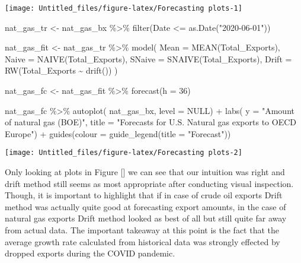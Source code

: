 \documentclass[
]{article}
\newenvironment{Shaded}{\begin{snugshade}}{\end{snugshade}}
\newcommand{\AttributeTok}[1]{\textcolor[rgb]{0.77,0.63,0.00}{#1}}
\newcommand{\ConstantTok}[1]{\textcolor[rgb]{0.00,0.00,0.00}{#1}}
\newcommand{\DecValTok}[1]{\textcolor[rgb]{0.00,0.00,0.81}{#1}}
\newcommand{\FunctionTok}[1]{\textcolor[rgb]{0.00,0.00,0.00}{#1}}
\newcommand{\NormalTok}[1]{#1}
\newcommand{\OtherTok}[1]{\textcolor[rgb]{0.56,0.35,0.01}{#1}}
\newcommand{\SpecialCharTok}[1]{\textcolor[rgb]{0.00,0.00,0.00}{#1}}
\newcommand{\StringTok}[1]{\textcolor[rgb]{0.31,0.60,0.02}{#1}}
\begin{document}
\begin{center}\texttt{[image: Untitled\_files/figure-latex/Forecasting plots-1]} \end{center}

\begin{Shaded}
\begin{Highlighting}[]
\NormalTok{nat\_gas\_tr }\OtherTok{\textless{}{-}}\NormalTok{ nat\_gas\_bx }\SpecialCharTok{\%\textgreater{}\%} 
  \FunctionTok{filter}\NormalTok{(Date }\SpecialCharTok{\textless{}=} \FunctionTok{as.Date}\NormalTok{(}\StringTok{"2020{-}06{-}01"}\NormalTok{))}


\NormalTok{nat\_gas\_fit }\OtherTok{\textless{}{-}}\NormalTok{ nat\_gas\_tr }\SpecialCharTok{\%\textgreater{}\%} 
  \FunctionTok{model}\NormalTok{(}
    \AttributeTok{Mean =} \FunctionTok{MEAN}\NormalTok{(Total\_Exports),}
    \AttributeTok{Naive =} \FunctionTok{NAIVE}\NormalTok{(Total\_Exports),}
    \AttributeTok{SNaive =} \FunctionTok{SNAIVE}\NormalTok{(Total\_Exports),}
    \AttributeTok{Drift =} \FunctionTok{RW}\NormalTok{(Total\_Exports }\SpecialCharTok{\textasciitilde{}} \FunctionTok{drift}\NormalTok{())}
\NormalTok{  )}

\NormalTok{nat\_gas\_fc }\OtherTok{\textless{}{-}}\NormalTok{ nat\_gas\_fit }\SpecialCharTok{\%\textgreater{}\%} 
  \FunctionTok{forecast}\NormalTok{(}\AttributeTok{h =} \DecValTok{36}\NormalTok{)}

\NormalTok{nat\_gas\_fc }\SpecialCharTok{\%\textgreater{}\%} 
  \FunctionTok{autoplot}\NormalTok{(}
\NormalTok{    nat\_gas\_bx,}
    \AttributeTok{level =} \ConstantTok{NULL}\NormalTok{) }\SpecialCharTok{+}
  \FunctionTok{labs}\NormalTok{(}
    \AttributeTok{y =} \StringTok{"Amount of natural gas (BOE)"}\NormalTok{,}
    \AttributeTok{title =} \StringTok{"Forecasts for U.S. Natural gas exports to OECD Europe"}\NormalTok{) }\SpecialCharTok{+}
  \FunctionTok{guides}\NormalTok{(}\AttributeTok{colour =} \FunctionTok{guide\_legend}\NormalTok{(}\AttributeTok{title =} \StringTok{"Forecast"}\NormalTok{))}
\end{Highlighting}
\end{Shaded}

\begin{center}\texttt{[image: Untitled\_files/figure-latex/Forecasting plots-2]} \end{center}

Only looking at plots in Figure {[}{]} we can see that our intuition was
right and drift method still seems as most appropriate after conducting
visual inspection. Though, it is important to highlight that if in case
of crude oil exports Drift method was actually quite good at forecasting
export amounts, in the case of natural gas exports Drift method looked
as best of all but still quite far away from actual data. The important
takeaway at this point is the fact that the average growth rate
calculated from historical data was strongly effected by dropped exports
during the COVID pandemic.
\end{document}
